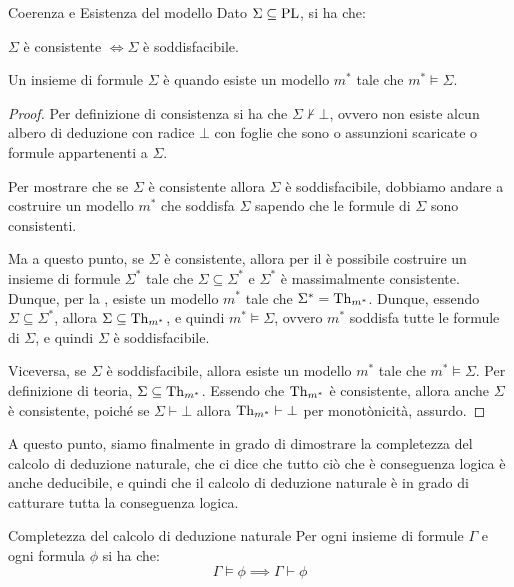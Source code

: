 \begin{theorem}[namedlabel={thm:coherence_and_model-existence}{Coerenza e Esistenza del modello}]{Coerenza e Esistenza del modello}
  Dato \(\Sigma\subseteq\operatorname{PL}\), si ha che:
  
  \(\Sigma\) è consistente \(\iff\Sigma\) è soddisfacibile.
\end{theorem}

Un insieme di formule \(\Sigma\) è  quando esiste un modello \(m^*\) tale che \(m^*\models\Sigma\).

\begin{proof}
  Per definizione di consistenza si ha che \(\Sigma \not\vdash \bot\), ovvero non esiste alcun albero di deduzione con radice \(\bot\) con foglie che sono o assunzioni scaricate o formule appartenenti a \(\Sigma\).

  Per mostrare che se \(\Sigma\) è consistente allora \(\Sigma\) è soddisfacibile, dobbiamo andare a costruire un modello \(m^*\) che soddisfa \(\Sigma\) sapendo che le formule di \(\Sigma\) sono consistenti.

  Ma a questo punto, se \(\Sigma\) è consistente, allora per il  è possibile costruire un insieme di formule \(\Sigma^*\) tale che \(\Sigma\subseteq\Sigma^*\) e \(\Sigma^*\) è massimalmente consistente.
  Dunque, per la , esiste un modello \(m^*\) tale che \(\Sigma^* = \operatorname{Th}_{m^*}\). Dunque, essendo \(\Sigma\subseteq\Sigma^*\), allora \(\Sigma\subseteq\operatorname{Th}_{m^*}\), e quindi \(m^*\models\Sigma\), ovvero \(m^*\) soddisfa tutte le formule di \(\Sigma\), e quindi \(\Sigma\) è soddisfacibile.

  Viceversa, se \(\Sigma\) è soddisfacibile, allora esiste un modello \(m^*\) tale che \(m^*\models\Sigma\). Per definizione di teoria, \(\Sigma\subseteq\operatorname{Th}_{m^*}\).
  Essendo che \(\operatorname{Th}_{m^*}\) è consistente, allora anche \(\Sigma\) è consistente, poiché se \(\Sigma\vdash\bot\) allora \(\operatorname{Th}_{m^*}\vdash\bot\) per monotònicità, assurdo.
\end{proof}

A questo punto, siamo finalmente in grado di dimostrare la completezza del calcolo di deduzione naturale, che ci dice che tutto ciò che è conseguenza logica è anche deducibile, e quindi che il calcolo di deduzione naturale è in grado di catturare tutta la conseguenza logica.

\begin{theorem}{Completezza del calcolo di deduzione naturale}
  Per ogni insieme di formule \(\Gamma\) e ogni formula \(\phi\) si ha che:
  \[\Gamma \models \phi \implies \Gamma \vdash \phi\]
\end{theorem}

